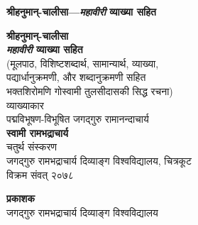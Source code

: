 \documentclass[luatex,twoside]{book}
\begin{document}
\begin{titlepage}
\thispagestyle{empty}
\begin{center}
\vspace*{4mm}
{\fontsize{20}{24}\selectfont \textbf{श्रीहनुमान्‌-चालीसा—\textit{महावीरी} व्याख्या सहित}}\\
\end{center}
\cleardoublepage
\thispagestyle{empty}
\begin{center}
\vspace*{4.5mm}
{\fontsize{36}{54}\selectfont \textbf{श्रीहनुमान्‌-चालीसा}}\\
\vspace*{4.5mm}
{\fontsize{28}{42}\selectfont \textbf{\textit{महावीरी} व्याख्या सहित}}\\
\vspace*{10mm}
{\fontsize{18}{24}\selectfont (मूलपाठ, विशिष्टशब्दार्थ, सामान्यार्थ, व्याख्या,}\\
\vspace*{1mm}
{\fontsize{18}{24}\selectfont  पद्यार्धानुक्रमणी, और शब्दानुक्रमणी सहित}\\
\vspace*{1mm}
{\fontsize{18}{24}\selectfont  भक्तशिरोमणि गोस्वामी तुलसीदासकी सिद्ध रचना)}\\
\vfill
{\fontsize{16}{22}\selectfont व्याख्याकार}\\
\vspace*{2.5mm}
{\fontsize{20}{30}\selectfont पद्मविभूषण-विभूषित जगद्गुरु रामानन्दाचार्य}\\
\vspace*{2mm}
{\fontsize{26}{39}\selectfont \textbf{स्वामी रामभद्राचार्य}}\\
\vfill
{\fontsize{18}{27}\selectfont चतुर्थ संस्करण}\\
\vfill
{\fontsize{16}{24}\selectfont जगद्गुरु रामभद्राचार्य दिव्याङ्ग विश्वविद्यालय, चित्रकूट}\\
\vspace*{2.5mm}
{\fontsize{16}{24}\selectfont विक्रम संवत् २०७८}
\vspace*{4.5mm}
\end{center}
\pagebreak
\thispagestyle{empty}
\begin{center}
\vspace*{2.5mm}
{\devanagarifont\fontsize{15}{17.5}\selectfont \textbf{प्रकाशक}}\\
\vspace*{1.25mm}
{\fontsize{15}{17.5}\selectfont जगद्गुरु रामभद्राचार्य  दिव्याङ्ग विश्वविद्यालय}\\

\end{center}
\end{titlepage}
\end{document}
